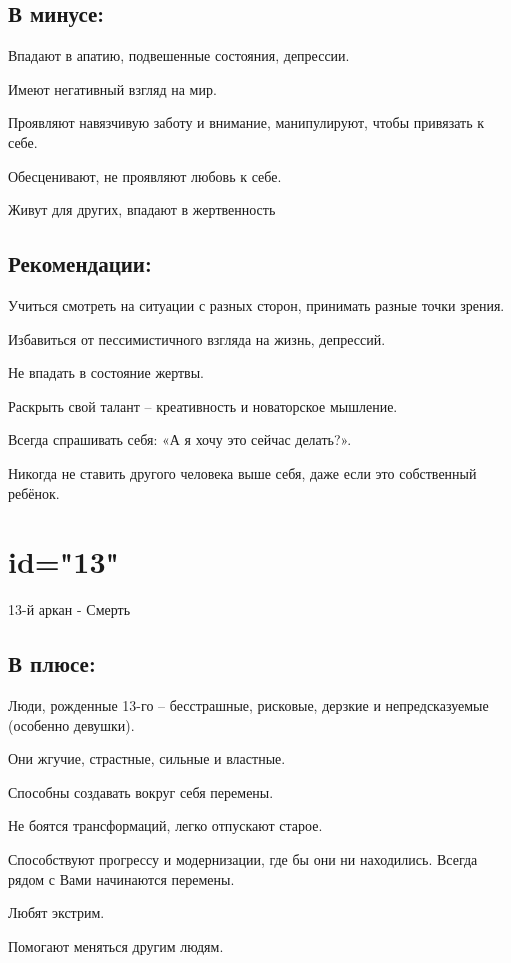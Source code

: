 \subsection{В минусе:}
\item Впадают в апатию, подвешенные состояния, депрессии. 
\item Имеют негативный взгляд на мир.
\item Проявляют навязчивую заботу и внимание, манипулируют, чтобы привязать к себе.
\item Обесценивают, не проявляют любовь к себе.
\item Живут для других, впадают в жертвенность
\endsubsection

\subsection{Рекомендации:}
\item Учиться смотреть на ситуации с разных сторон, принимать разные точки зрения.        
\item Избавиться от пессимистичного взгляда на жизнь, депрессий.                          
\item Не впадать в состояние жертвы.                                                      
\item Раскрыть свой талант – креативность и новаторское мышление.                         
\item Всегда спрашивать себя: «А я хочу это сейчас делать?».                              
\item Никогда не ставить другого человека выше себя, даже если это собственный ребёнок.   
\endsubsection

\endsection

\section{id="13"}{13-й аркан - Смерть}

\subsection{В плюсе:}
\item Люди, рожденные 13-го – бесстрашные, рисковые, дерзкие и непредсказуемые (особенно девушки).
\item Они жгучие, страстные, сильные и властные.
\item Способны создавать вокруг себя перемены.
\item Не боятся трансформаций, легко отпускают старое.
\item Способствуют прогрессу и модернизации, где бы они ни находились. Всегда рядом с Вами начинаются перемены.
\item Любят экстрим.
\item Помогают меняться другим людям.
\endsubsection

